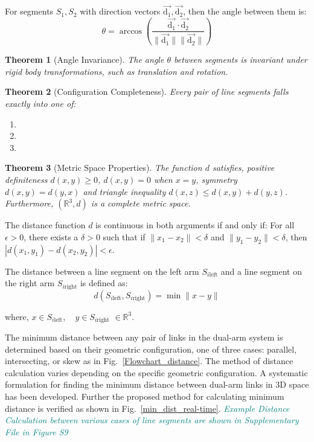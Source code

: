 \documentclass[utf8]{FrontiersinHarvard}
\newtheorem{theorem}{Theorem}
\begin{document}
\noindent For segments $S_1,S_2$ with direction vectors $\Vec{\mathrm{d}_1},\Vec{\mathrm{d}_2}$, then the angle between them is:
\[
\theta = \arccos\left(\frac{\vec{\mathrm{d}_1} \cdot \vec{\mathrm{d}_2}}{\|\vec{\mathrm{d}_1}\|\|\vec{\mathrm{d}_2}\|}\right)
\]

\begin{theorem}[Angle Invariance]
The angle $\theta$ between segments is invariant under rigid body transformations, such as translation and rotation. \citet{gallier2011geometric} 
\end{theorem}

\begin{theorem}[Configuration Completeness]
Every pair of line segments falls exactly into one of:
\begin{enumerate}
    \item {}
    \item {}
    \item {}
\end{enumerate} \citet{pottmann2001computational}
\end{theorem}

\begin{theorem}[Metric Space Properties]
The function $d$ satisfies, positive definiteness $d(x,y) \geq 0$, $d(x,y) = 0$ when $x = y$, symmetry $d(x,y) = d(y,x)$ and triangle inequality $d(x,z) \leq d(x,y) + d(y,z)$. Furthermore, $(\mathbb{R}^3,d)$ is a complete metric space.
\end{theorem}

\noindent The distance function $d$ is continuous in both arguments if and only if:\newline
For all $\epsilon > 0$, there exists a $\delta > 0$ such that if $\|x_1 - x_2\| < \delta$ and $\|y_1 - y_2\| < \delta$, then $|d(x_1, y_1) - d(x_2, y_2)| < \epsilon$.

\noindent The distance between a line segment on the left arm \( S_{i\text{left}} \) and a line segment on the right arm \( S_{i\text{right}} \) is defined as:
\begin{equation}
    d(S_{i\text{left}}, S_{i\text{right}}) = \min \|x - y\|
    \label{min_dist}
\end{equation}

where, \( x \in S_{i\text{left}}, \quad y \in S_{i\text{right}} \) \(\in \mathbb{R}^3 \).

The minimum distance between any pair of links in the dual-arm system is determined based on their geometric configuration, one of three cases: parallel, intersecting, or skew as in Fig.~\ref{Flowchart_distance}. The method of distance calculation varies depending on the specific geometric configuration. A systematic formulation for finding the minimum distance between dual-arm links in 3D space has been developed. Further the proposed method for calculating minimum distance is verified as shown in Fig.~\ref{min_dist_real-time}. \textit{\textcolor{teal}{Example Distance
Calculation between various cases of line segments are shown in Supplementary File in Figure S9}}
\end{document}
